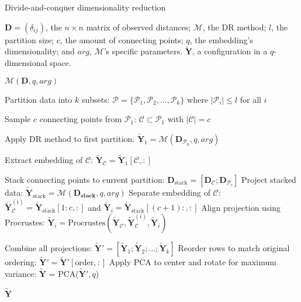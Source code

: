 \begin{algorithm}
    \caption{Divide-and-conquer dimensionality reduction}
    \label{alg:DivideConquer}
    
    \begin{algorithmic}[1]
    \REQUIRE $\mathbf{D} = (\delta_{ij})$, the $n \times n$ matrix of observed distances; $\mathcal{M}$, the DR method; $l$, the partition size; $c$, the amount of connecting points; $q$, the embedding's dimensionality; and $arg$, $\mathcal{M}$'s specific parameters.
    \ENSURE $\mathbf{\tilde{Y}}$, a configuration in a $q$-dimensional space.
    
        \RETURN $\mathcal{M}(\mathbf{D}, q, arg)$
    \ENDIF
    
    \STATE Partition data into $k$ subsets: $\mathcal{P} = \{\mathcal{P}_1, \mathcal{P}_2, \ldots, \mathcal{P}_k\}$ where $|\mathcal{P}_i| \leq l$ for all $i$
    
    \STATE Sample $c$ connecting points from $\mathcal{P}_1$: $\mathcal{C} \subset \mathcal{P}_1$ with $|\mathcal{C}| = c$
    
    \STATE Apply DR method to first partition: $\mathbf{\tilde{Y}}_1 = \mathcal{M}(\mathbf{D_{\mathcal{P}_1}}, q, arg)$

    \STATE Extract embedding of $\mathcal{C}$: $\mathbf{\tilde{Y}}_\mathcal{C} = \mathbf{\tilde{Y}}_1[{\mathcal{C}},:]$
    
        \STATE Stack connecting points to current partition: $\mathbf{D}_{\text{stack}} = [\mathbf{D}_{\mathcal{C}}; \mathbf{D}_{\mathcal{P}_i}]$
        \STATE Project stacked data: $\mathbf{\tilde{Y}}_{\text{stack}} = \mathcal{M}(\mathbf{D_{\text{stack}}}, q, arg)$
        \STATE Separate embedding of $\mathcal{C}$: $\mathbf{\tilde{Y}}_{\mathcal{C}}^{(i)} = \mathbf{\tilde{Y}}_{\text{stack}}[1:c,:]$ and $\mathbf{\tilde{Y}}_i = \mathbf{\tilde{Y}}_{\text{stack}}[(c+1):,:]$
        \STATE Align projection using Procrustes: $\mathbf{\tilde{Y}}_i = \text{Procrustes}(\mathbf{\tilde{Y}}_\mathcal{C}, \mathbf{\tilde{Y}}_{\mathcal{C}}^{(i)}, \mathbf{\tilde{Y}}_i)$
    \ENDFOR
    
    \STATE Combine all projections: $\mathbf{\tilde{Y}}' = [\mathbf{\tilde{Y}}_1; \mathbf{\tilde{Y}}_2; \ldots; \mathbf{\tilde{Y}}_k]$
    \STATE Reorder rows to match original ordering: $\mathbf{\tilde{Y}}' = \mathbf{\tilde{Y}}'[\text{order},:]$
    \STATE Apply PCA to center and rotate for maximum variance: $\mathbf{\tilde{Y}}$ = PCA($\mathbf{\tilde{Y}}', q$)
    
    \RETURN $\mathbf{\tilde{Y}}$
    \end{algorithmic}
\end{algorithm}

